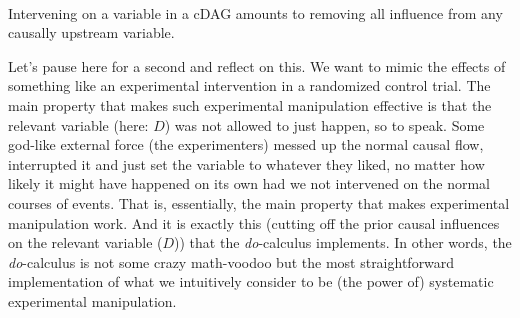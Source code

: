\documentclass[nobib]{tufte-handout}
\newcommand{\docalc}{\emph{do}-calculus\xspace}
\newcommand{\mathdo}{\mathit{do}}
\begin{document}
\begin{marginfigure}[1cm]
  \centering
  \\
  \vspace{-0.5cm}
  \vspace{-1cm}
  \caption{Intervening on a variable in a cDAG amounts to removing all influence from any causally upstream variable.}
  \label{fig:cDAGs-pruned}
\end{marginfigure}

Let's pause here for a second and reflect on this.
We want to mimic the effects of something like an experimental intervention in a randomized control trial.
The main property that makes such experimental manipulation effective is that the relevant variable (here: $D$) was not allowed to just happen, so to speak.
Some god-like external force (the experimenters) messed up the normal causal flow, interrupted it and just set the variable to whatever they liked, no matter how likely it might have happened on its own had we not intervened on the normal courses of events.
That is, essentially, the main property that makes experimental manipulation work.
And it is exactly this (cutting off the prior causal influences on the relevant variable ($D$)) that the \docalc implements.
In other words, the \docalc is not some crazy math-voodoo but the most straightforward implementation of what we intuitively consider to be (the power of) systematic experimental manipulation.
\end{document}
